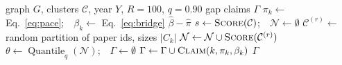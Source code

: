 \documentclass[conference]{IEEEtran}
\newcommand{\cC}{\mathcal{C}}
\newcommand{\norm}[1]{\widehat{#1}}
\DeclareMathOperator{\Quant}{Quantile}
\begin{document}
\begin{algorithm}[!t]
\caption{Bootstrap-calibrated gap detection}
\label{alg:gap}
\small
\begin{algorithmic}[1]
\Require graph $G$, clusters $\cC$, year $Y$, $R=100$, $q=0.90$
\Ensure gap claims $\Gamma$
\Function{Score}{$\cC$}
  \State $\pi_k\gets$ Eq.~\eqref{eq:pace};\ \ $\beta_k\gets$ Eq.~\eqref{eq:bridge}
  \State \Return $\norm{\beta}-\norm{\pi}$ 
\EndFunction
\State $s\gets\textsc{Score}(\cC)$;\ \ $\mathcal{N}\gets\emptyset$
  \State $\cC^{(r)}\gets$ random partition of paper ids, sizes $|C_k|$
  \State $\mathcal{N}\gets\mathcal{N}\cup\textsc{Score}(\cC^{(r)})$
\EndFor
\State $\theta\gets\Quant_q(\mathcal{N})$;\ \ $\Gamma\gets\emptyset$
  \State $\Gamma\gets\Gamma\cup\textsc{Claim}(k,\pi_k,\beta_k)$
\EndFor
\State \Return $\Gamma$
\end{algorithmic}
\end{algorithm}
\end{document}
